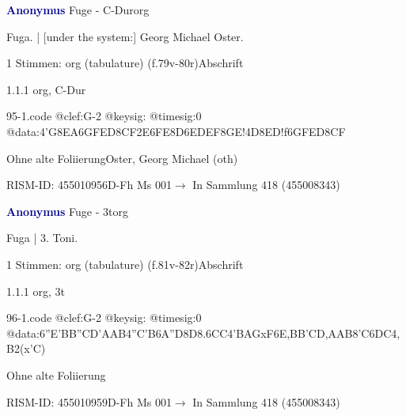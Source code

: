 \documentclass[twocolumn, 12pt]{book}
\begin{document}
\par \vspace{16pt} \textcolor{darkblue}{\textbf{Anonymus  }}\hfillplus{\textbf{[95]}}\newline Fuge - C-Dur\newline org
\par \begin{itshape}[f.79v, at left:] Fuga. | [under the system:] Georg Michael Oster.\end{itshape} 
\par \textcolor{darkblue}{}  1 Stimmen: org (tabulature)  (f.79v-80r)\newline Abschrift
\par 1.1.1  org, C-Dur  
\begin{filecontents*}{95-1.code}
@clef:G-2
@keysig:
@timesig:0
@data:4'G{8EA}{6GFED}{8CF}2E{6FE8D}{6EDEF}{8GE}!4D{8ED}!f{6GFED}{8CF}
\end{filecontents*}
\newline %
\par Ohne alte Foliierung\newline Oster, Georg Michael  (oth)
\par RISM-ID: 455010956\newline D-Fh  Ms 001\newline $\rightarrow$ In Sammlung 418 (455008343)
      
\par \vspace{16pt} \textcolor{darkblue}{\textbf{Anonymus  }}\hfillplus{\textbf{[96]}}\newline Fuge - 3t\newline org
\par \begin{itshape}[f.81v, at left:] Fuga | 3. Toni.\end{itshape} 
\par \textcolor{darkblue}{}  1 Stimmen: org (tabulature)  (f.81v-82r)\newline Abschrift
\par 1.1.1  org, 3t  
\begin{filecontents*}{96-1.code}
@clef:G-2
@keysig:
@timesig:0
@data:{6''E'BB''C}{D'AAB}4''C'B{6A''D}8D{8.6CC}4'BAGxF{6E,BB'C}{D,AAB}8'C{6DC}4,B2(x'C)
\end{filecontents*}
\newline %
\par Ohne alte Foliierung
\par RISM-ID: 455010959\newline D-Fh  Ms 001\newline $\rightarrow$ In Sammlung 418 (455008343)
      
\end{document}

